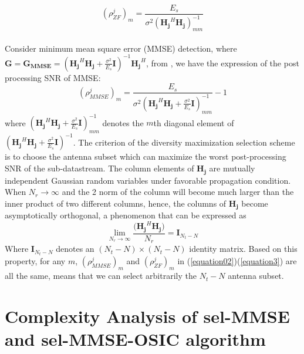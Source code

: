 \documentclass[12pt,a4paper,final]{article}
\begin{document}
\begin{spacing}{2.5}
\begin{equation}
(\rho_{ZF}^{j})_{m}=\frac{E_{s}}{\sigma^{2}(\mathbf{H_{j}}^{H}\mathbf{H_{j}})_{mm}^{-1}}\label{equation02}
\end{equation}\\
Consider minimum mean square error (MMSE) detection, where $\mathbf{G}=\mathbf{G_{MMSE}}=(\mathbf{H_{j}}^{H}\mathbf{H_{j}}+\frac{\sigma^{2}}{E_{s}}\mathbf{I})^{-1}\mathbf{H_{j}}^{H}$, from \cite{5} \cite{6}, we have the expression of the post processing SNR of MMSE:
\begin{equation}
(\rho_{MMSE}^{j})_{m}=\frac{E_{s}}{\sigma^{2}(\mathbf{H_{j}}^{H}\mathbf{H_{j}}+\frac{\sigma^{2}}{E_{s}}\mathbf{I})^{-1}_{mm}}-1\label{equation3}
\end{equation}
where $(\mathbf{H_{j}}^{H}\mathbf{H_{j}}+\frac{\sigma^{2}}{E_{s}}\mathbf{I})^{-1}_{mm}$ denotes the $m$th diagonal element of $(\mathbf{H_{j}}^{H}\mathbf{H_{j}}+\frac{\sigma^{2}}{E_{s}}\mathbf{I})^{-1}$.
The criterion of the diversity maximization selection scheme is to choose the antenna subset which can maximize the worst post-processing SNR of the sub-datastream. The column elements of $\mathbf{H_{j}}$ are mutually independent Gaussian random variables under favorable propagation condition. When $N_{r}\to \infty$ and the 2 norm of the column will become much larger than the inner product of two different columns, hence, the columns of $\mathbf{H_{j}}$ become asymptotically orthogonal, a phenomenon that can be expressed as
\begin{equation}
\lim_{N_{r}\to \infty}\frac{(\mathbf{H_{j}}^{H}\mathbf{H_{j})}}{N_{r}}=\mathbf{I}_{N_t-N}
\end{equation}
 Where $\mathbf{I}_{N_t-N}$ denotes an $(N_{t}-N)\times (N_{t}-N)$ identity matrix. Based on this property, for any $m$, $(\rho_{MMSE}^{j})_{m}$ and $(\rho_{ZF}^{j})_{m}$ in (\ref{equation02})(\ref{equation3}) are all the same, means that we can select arbitrarily the $N_{t}-N$ antenna subset.
\section{Complexity Analysis of sel-MMSE and sel-MMSE-OSIC algorithm}\label{complexity}

\end{spacing}
\end{document}
